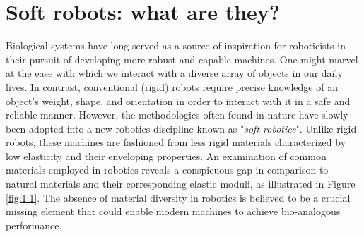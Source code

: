 \section{Soft robots: what are they?}
\label{sec:intro:history}
Biological systems have long served as a source of inspiration for roboticists in their pursuit of developing more robust and capable machines. One might marvel at the ease with which we interact with a diverse array of objects in our daily lives. In contrast, conventional (rigid) robots require precise knowledge of an object's weight, shape, and orientation in order to interact with it in a safe and reliable manner. However, the methodologies often found in nature have slowly been adopted into a new robotics discipline known as "\emph{soft robotics}". Unlike rigid robots, these machines are fashioned from less rigid materials characterized by low elasticity and their enveloping properties. An examination of common materials employed in robotics reveals a conspicuous gap in comparison to natural materials and their corresponding elastic moduli, as illustrated in Figure \ref{fig:1:1}. The absence of material diversity in robotics is believed to be a crucial missing element that could enable modern machines to achieve bio-analogous performance.

